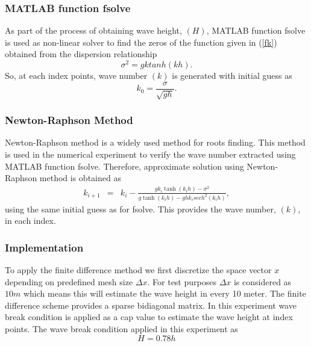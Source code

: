 \subsubsection*{MATLAB function fsolve}
As part of the process of obtaining wave height, $(H)$, MATLAB function fsolve is used as non-linear solver to find the zeros of the function given in (\ref{fk}) obtained from the dispersion relationship
$$
\sigma^{2}=gk tanh(kh).
$$ 
So, at each index points, wave number $(k)$ is generated with initial guess as
$$k_0=\frac{\sigma}{\sqrt{gh}}.$$
\subsubsection*{Newton-Raphson Method}
Newton-Raphson method is a widely used method for roots finding. This method is used in the numerical experiment to verify the wave number extracted using MATLAB function fsolve. Therefore, approximate solution using Newton-Raphson method is obtained as
\begin{eqnarray}
k_{i+1}& =& k_{i}-\frac{gk_i\tanh(k_ih)-\sigma^2}{g\tanh(k_ih)-ghk_i sech^2(k_ih)},
\end{eqnarray}
using the same initial guess as for fsolve.
This provides the wave number, $(k)$, in each index.

\subsubsection{Implementation}
To apply the finite difference method we first discretize the space vector ${x}$ depending on predefined mesh size ${\Delta x}$. For test purposes ${\Delta x}$ is considered as ${10m}$ which means this will estimate the wave height in every 10 meter. The finite difference scheme provides a sparse bidiagonal matrix. In this experiment wave break condition is applied as a cap value to estimate the wave height at index points. The wave break condition applied in this experiment as
$${H=0.78h}$$

